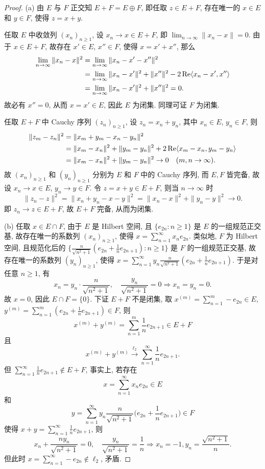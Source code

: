 \begin{proof}
    (a) 由 $E$ 与 $F$ 正交知 $E+F=E\oplus F$, 即任取 $z\in E+F$,
    存在唯一的 $x\in E$ 和 $y\in F$, 使得 $z=x+y$.

    \necessary
    任取 $E$ 中收敛列 $(x_n)_{n\geq 1}$, 设 $x_n\to x\in E+F$,
    即 $\lim_{n\to\infty}\|x_n-x\|=0$. 由于 $x\in E+F$, 故存在 $x'\in E$, $x''\in F$,
    使得 $x=x'+x''$, 那么
    \begin{align*}
        \lim_{n\to\infty}\|x_n-x\|^2
        & =\lim_{n\to\infty}\|x_n-x'-x''\|^2 \\
        & =\lim_{n\to\infty}\|x_n-x'\|^2+\|x''\|^2-2\operatorname{Re}\langle x_n-x',x''\rangle \\
        & =\lim_{n\to\infty}\|x_n-x'\|^2+\|x''\|^2=0.
    \end{align*}
    故必有 $x''=0$, 从而 $x=x'\in E$, 因此 $E$ 为闭集. 同理可证 $F$ 为闭集.

    \sufficient
    任取 $E+F$ 中 Cauchy 序列 $(z_n)_{n\geq 1}$, 设 $z_n=x_n+y_n$, 其中 $x_n\in E$, $y_n\in F$, 则
    \begin{align*}
        \|z_m-z_n\|^2
        & =\|x_m+y_m-x_n-y_n\|^2 \\
        & =\|x_m-x_n\|^2+\|y_m-y_n\|^2+2\operatorname{Re}\langle x_m-x_n,y_m-y_n\rangle \\
        & =\|x_m-x_n\|^2+\|y_m-y_n\|^2\to 0\quad (m,n\to\infty).
    \end{align*}
    故 $(x_n)_{n\geq 1}$ 和 $(y_n)_{n\geq 1}$ 分别为 $E$ 和 $F$ 中的 Cauchy 序列,
    而 $E,F$ 皆完备, 故设 $x_n\to x\in E$, $y_n\to y\in F$.
    令 $z=x+y\in E+F$, 则当 $n\to\infty$ 时
    \[\|z_n-z\|^2=\|x_n+y_n-x-y\|^2=\|x_n-x\|^2+\|y_n-y\|^2\to 0.\]
    即 $z_n\to z\in E+F$, 故 $E+F$ 完备, 从而为闭集.

    (b) 任取 $x\in E\cap F$, 由于 $E$ 是 Hilbert 空间, 且
    $\{e_{2n}:n\geq 1\}$ 是 $E$ 的一组规范正交基, 故存在唯一的系数列 $(x_n)_{n\geq 1}$,
    使得 $x=\sum_{n=1}^{\infty}x_n e_{2n}$. 类似地, $F$ 为 Hilbert 空间, 且规范化后的
    $\{\frac{n}{\sqrt{n^2+1}}(e_{2n}+\frac{1}{n}e_{2n+1}):n\geq 1\}$ 是 $F$ 的一组规范正交基,
    故存在唯一的系数列 $(y_n)_{n\geq 1}$, 
    使得 $x=\sum_{n=1}^{\infty}y_n\frac{n}{\sqrt{n^2+1}}(e_{2n}+\frac{1}{n}e_{2n+1})$.
    于是对任意 $n\geq 1$, 有
    \[x_n=y_n\cdot\frac{n}{\sqrt{n^2+1}},\quad\frac{y_n}{\sqrt{n^2+1}}=0\Longrightarrow x_n=y_n=0.\]
    故 $x=0$, 因此 $E\cap F=\{0\}$. 下证 $E+F$ 不是闭集,
    取 $x^{(m)}=\sum_{n=1}^m -e_{2n}\in E$, $y^{(m)}=\sum_{n=1}^m (e_{2n}+\frac{1}{n}e_{2n+1})\in F$,
    则
    \[x^{(m)}+y^{(m)}=\sum_{n=1}^m \frac{1}{n}e_{2n+1}\in E+F\]
    且
    \[x^{(m)}+y^{(m)}\xrightarrow{\ell_2}\sum_{n=1}^{\infty}\frac{1}{n}e_{2n+1}.\]
    但 $\sum_{n=1}^{\infty}\frac{1}{n}e_{2n+1}\notin E+F$, 事实上, 若存在
    \[x=\sum_{n=1}^{\infty}x_n e_{2n}\in E\]
    和
    \[y=\sum_{n=1}^{\infty}y_n\frac{n}{\sqrt{n^2+1}}
      \biggl(e_{2n}+\frac{1}{n}e_{2n+1}\biggr)\in F\]
    使得 $x+y=\sum_{n=1}^{\infty}\frac{1}{n}e_{2n+1}$, 则
    \[x_n+\frac{ny_n}{\sqrt{n^2+1}}=0,\quad\frac{y_n}{\sqrt{n^2+1}}=\frac{1}{n}\Longrightarrow x_n=-1,y_n=\frac{\sqrt{n^2+1}}{n}.\]
    但此时 $x=\sum_{n=1}^{\infty}-e_{2n}\notin\ell_2$, 矛盾.
\end{proof}



